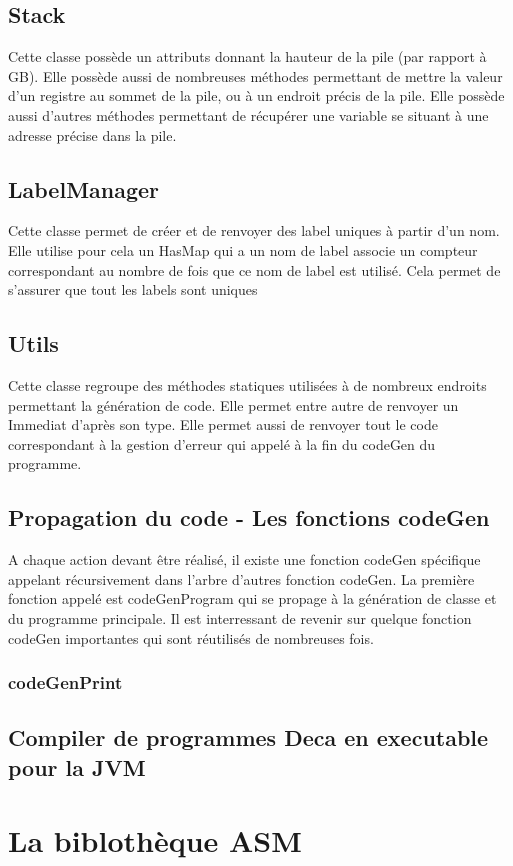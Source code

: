 \documentclass[12pt, a4paper, one side]{article}
\begin{document}
    \subsection{Stack}

    Cette classe possède un attributs donnant la hauteur de la pile (par rapport à GB). Elle possède aussi
    de nombreuses méthodes permettant de mettre la valeur d'un registre au sommet de la pile, ou à un
    endroit précis de la pile. Elle possède aussi d'autres méthodes permettant de récupérer une variable
    se situant à une adresse précise dans la pile.

    \subsection{LabelManager}

    Cette classe permet de créer et de renvoyer des label uniques à partir d'un nom. Elle utilise pour cela un HasMap
    qui a un nom de label associe un compteur correspondant au nombre de fois que ce nom de label est utilisé. Cela
    permet de s'assurer que tout les labels sont uniques

    \subsection{Utils}

    Cette classe regroupe des méthodes statiques utilisées à de nombreux endroits permettant la génération
    de code. Elle permet entre autre de renvoyer un Immediat d'après son type. Elle permet aussi de renvoyer tout
    le code correspondant à la gestion d'erreur qui appelé à la fin du codeGen du programme.

    \subsection{Propagation du code - Les fonctions codeGen}

    A chaque action devant être réalisé, il existe une fonction codeGen spécifique appelant récursivement dans l'arbre
    d'autres fonction codeGen. La première fonction appelé est codeGenProgram qui se propage à la génération de classe
    et du programme principale. Il est interressant de revenir sur quelque fonction codeGen importantes qui sont réutilisés
    de nombreuses fois.

    \subsubsection{codeGenPrint}

    \subsection{Compiler de programmes Deca en executable pour la JVM}
    \section{La biblothèque ASM}
\end{document}
